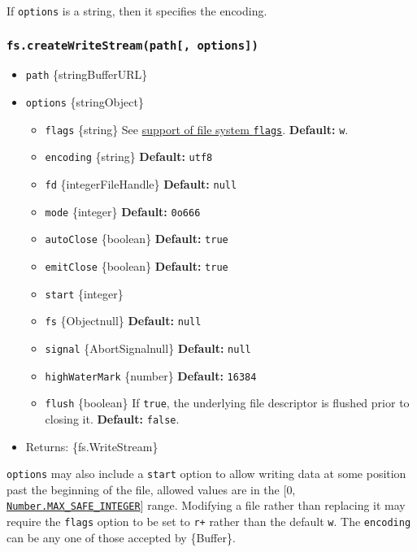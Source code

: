 If \texttt{options} is a string, then it specifies the encoding.

\subsubsection{\texorpdfstring{\texttt{fs.createWriteStream(path{[},\ options{]})}}{fs.createWriteStream(path{[}, options{]})}}\label{fs.createwritestreampath-options}

\begin{itemize}
\tightlist
\item
  \texttt{path} \{string\textbar Buffer\textbar URL\}
\item
  \texttt{options} \{string\textbar Object\}

  \begin{itemize}
  \tightlist
  \item
    \texttt{flags} \{string\} See \hyperref[file-system-flags]{support
    of file system \texttt{flags}}. \textbf{Default:}
    \texttt{\textquotesingle{}w\textquotesingle{}}.
  \item
    \texttt{encoding} \{string\} \textbf{Default:}
    \texttt{\textquotesingle{}utf8\textquotesingle{}}
  \item
    \texttt{fd} \{integer\textbar FileHandle\} \textbf{Default:}
    \texttt{null}
  \item
    \texttt{mode} \{integer\} \textbf{Default:} \texttt{0o666}
  \item
    \texttt{autoClose} \{boolean\} \textbf{Default:} \texttt{true}
  \item
    \texttt{emitClose} \{boolean\} \textbf{Default:} \texttt{true}
  \item
    \texttt{start} \{integer\}
  \item
    \texttt{fs} \{Object\textbar null\} \textbf{Default:} \texttt{null}
  \item
    \texttt{signal} \{AbortSignal\textbar null\} \textbf{Default:}
    \texttt{null}
  \item
    \texttt{highWaterMark} \{number\} \textbf{Default:} \texttt{16384}
  \item
    \texttt{flush} \{boolean\} If \texttt{true}, the underlying file
    descriptor is flushed prior to closing it. \textbf{Default:}
    \texttt{false}.
  \end{itemize}
\item
  Returns: \{fs.WriteStream\}
\end{itemize}

\texttt{options} may also include a \texttt{start} option to allow
writing data at some position past the beginning of the file, allowed
values are in the {[}0,
\href{https://developer.mozilla.org/en-US/docs/Web/JavaScript/Reference/Global_Objects/Number/MAX_SAFE_INTEGER}{\texttt{Number.MAX\_SAFE\_INTEGER}}{]}
range. Modifying a file rather than replacing it may require the
\texttt{flags} option to be set to \texttt{r+} rather than the default
\texttt{w}. The \texttt{encoding} can be any one of those accepted by
\{Buffer\}.

